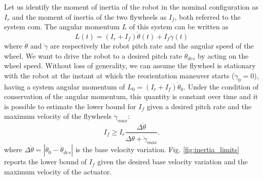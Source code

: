 \documentclass[sensors,article,submit,pdftex,moreauthors]{Definitions/mdpi}
\begin{document}
Let us identify the moment of inertia of the robot in the nominal configuration as $I_r$ and the moment of inertia of the two flywheels as $I_f$, both referred to the system \gls{com}.
The angular momentum $L$ of this system can be written as
\begin{equation}\label{eq:ang_mom_elroy}
L(t) = \left(I_r + I_{f}\right)\dot{\theta}(t) + I_{f}\dot{\gamma}(t)
\end{equation}
where $\dot{\theta}$ and $\dot{\gamma}$ are respectively the robot pitch rate and the angular speed of the wheel.
We want to drive the robot to a desired pitch rate $\dot{\theta}_{des}$ by acting on the wheel speed.
Without loss of generality, we can assume the flywheel is stationary with the robot at the instant at which the reorientation maneuver starts ($\dot{\gamma}_0 = 0$), having a system angular momentum of $L_0 = \left(I_r + I_{f}\right)\dot{\theta}_0$.
Under the condition of conservation of the angular momentum, this quantity is constant over time and it is possible to estimate the lower bound for $I_{f}$ given a desired pitch rate and the maximum velocity of the flywheels $\dot{\gamma}_{max}$:
\begin{equation}
I_{f} \geq I_r \dfrac{ \Delta \dot{\theta} }{\Delta \dot{\theta}+\dot{\gamma}_{max}}.
\end{equation}
where $\Delta \dot{\theta} =  \left\lvert \dot{\theta}_0-\dot{\theta}_{des} \right\rvert$ is the base velocity variation.
Fig. \ref{fig:inertia_limits} reports the lower bound of $I_{f}$ given the desired base velocity variation and the maximum velocity of the actuator.
\end{document}
